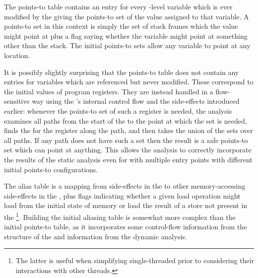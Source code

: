 The points-to table contains an entry for every {\StateMachine}-level
variable which is ever modified by the {\StateMachine} giving the
points-to set of the value assigned to that variable.  A points-to set
in this context is simply the set of stack frames which the value
might point at plus a flag saying whether the variable might point at
something other than the stack.  The initial points-to sets allow any
variable to point at any location.

It is possibly slightly surprising that the points-to table does not
contain any entries for variables which are referenced but never
modified.  These correspond to the initial values of program
registers.  They are instead handled in a flow-sensitive way using the
{\StateMachine}'s internal control flow and the 
side-effects introduced earlier: whenever the points-to set of such a
register is needed, the analysis examines all paths from the start of
the {\StateMachine} to the point at which the set is needed, finds the
 for the register along the path, and then takes the
union of the sets over all paths.  If any path does not have such a
set then the result is a safe points-to set which can point at
anything.  This allows the analysis to correctly incorporate the
results of the static analysis even for {\StateMachines} with multiple
entry points with different initial points-to configurations.
  

The alias table is a mapping from  side-effects in the
{\StateMachine} to other memory-accessing side-effects in the
{\StateMachine}, plus flags indicating whether a given load operation
might load from the initial state of memory or load the result of a
store not present in the {\StateMachine}\footnote{The latter is useful
  when simplifying single-threaded {\StateMachines} prior to
  considering their interactions with other threads.}.  Building the
initial aliasing table is somewhat more complex than the initial
points-to table, as it incorporates some control-flow information from
the structure of the {\StateMachine} and information from the dynamic
analysis.


